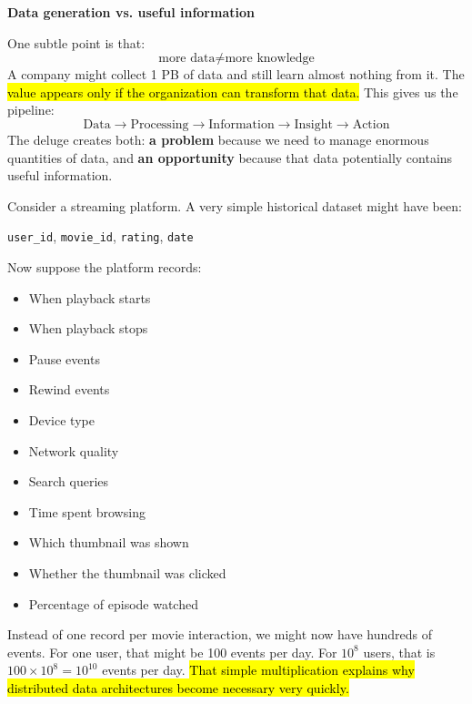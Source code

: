 \highspace
\begin{flushleft}
    \textcolor{Green3}{ \textbf{Data generation vs. useful information}}
\end{flushleft}
One subtle point is that:
\begin{equation*}
    \text{more data} \neq \text{more knowledge}
\end{equation*}
A company might collect 1 PB of data and still learn almost nothing from it. The \hl{value appears only if the organization can transform that data.} This gives us the pipeline:
\begin{equation*}
    \text{Data}
    \rightarrow
    \text{Processing}
    \rightarrow
    \text{Information}
    \rightarrow
    \text{Insight}
    \rightarrow
    \text{Action}
\end{equation*}
The deluge creates both: \textbf{a problem} because we need to manage enormous quantities of data, and \textbf{an opportunity} because that data potentially contains useful information.

\highspace
\begin{examplebox}
    Consider a streaming platform. A very simple historical dataset might have been:
    \begin{center}
        \texttt{user\_id}, \texttt{movie\_id}, \texttt{rating}, \texttt{date}
    \end{center}
    Now suppose the platform records:
    \begin{itemize}
        \item When playback starts
        \item When playback stops
        \item Pause events
        \item Rewind events
        \item Device type
        \item Network quality
        \item Search queries
        \item Time spent browsing
        \item Which thumbnail was shown
        \item Whether the thumbnail was clicked
        \item Percentage of episode watched
    \end{itemize}
    Instead of one record per movie interaction, we might now have hundreds of events. For one user, that might be 100 events per day. For $10^8$ users, that is $100 \times 10^8 = 10^{10}$ events per day. \hl{That simple multiplication explains why distributed data architectures become necessary very quickly.}
\end{examplebox}

